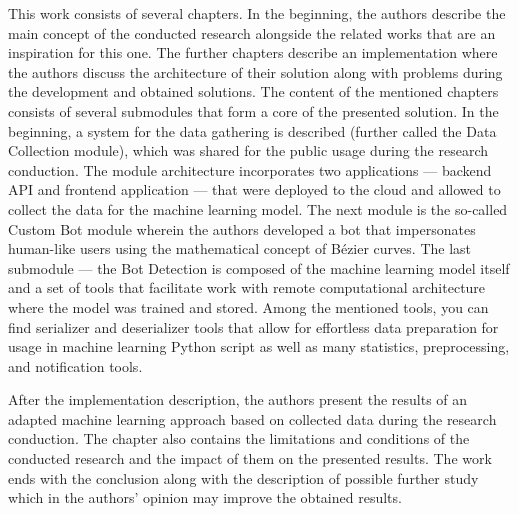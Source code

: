This work consists of several chapters.
In the beginning, the authors describe the main concept of the conducted research alongside the related works that are an inspiration for this one.
The further chapters describe an implementation where the authors discuss the architecture of their solution along with problems during the development and obtained solutions.
The content of the mentioned chapters consists of several submodules that form a core of the presented solution.
In the beginning, a system for the data gathering is described (further called the Data Collection module), which was shared for the public usage during the research conduction.
The module architecture incorporates two applications --- backend API and frontend application --- that were deployed to the cloud and allowed to collect the data for the machine learning model.
The next module is the so-called Custom Bot module wherein the authors developed a bot that impersonates human-like users using the mathematical concept of Bézier curves.
The last submodule --- the Bot Detection is composed of the machine learning model itself and a set of tools that facilitate work with remote computational architecture where the model was trained and stored.
Among the mentioned tools, you can find serializer and deserializer tools that allow for effortless data preparation for usage in machine learning Python script as well as many statistics, preprocessing, and notification tools.

After the implementation description, the authors present the results of an adapted machine learning approach based on collected data during the research conduction.
The chapter also contains the limitations and conditions of the conducted research and the impact of them on the presented results.
The work ends with the conclusion along with the description of possible further study which in the authors' opinion may improve the obtained results.